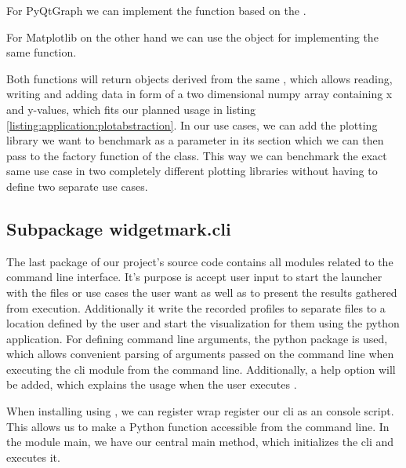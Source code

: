 For PyQtGraph we can implement the  function based
on the .



For Matplotlib on the other hand we can use the 
object for implementing the same function.



Both functions will return objects derived from the same
, which allows reading, writing and adding
data in form of a two dimensional numpy array containing x and y-values, which
fits our planned usage in listing \ref{listing:application:plotabstraction}. In
our use cases, we can add the plotting library we want to benchmark as a
parameter in its  section which we can then pass
to the factory function  of the
 class. This way we can benchmark the exact
same use case in two completely different plotting libraries without having to
define two separate use cases.

\subsection{Subpackage widgetmark.cli}

The last package of our project's source code contains all modules related to
the command line interface. It's purpose is accept user input to start the
launcher with the files or use cases the user want as well as to present the
results gathered from execution. Additionally it write the recorded profiles to
separate files to a location defined by the user and start the visualization for
them using the  python application. For defining
command line arguments, the python package  is
used, which allows convenient parsing of arguments passed on the command line
when executing the \gls{cli} module from the command line. Additionally, a help
option will be added, which explains the usage when the user executes
.

When installing  using
, we can register wrap register our \gls{cli} as
an console script. This allows us to make a Python function accessible from the
command line. In the module main, we have our central main method, which
initializes the \gls{cli} and executes it.

